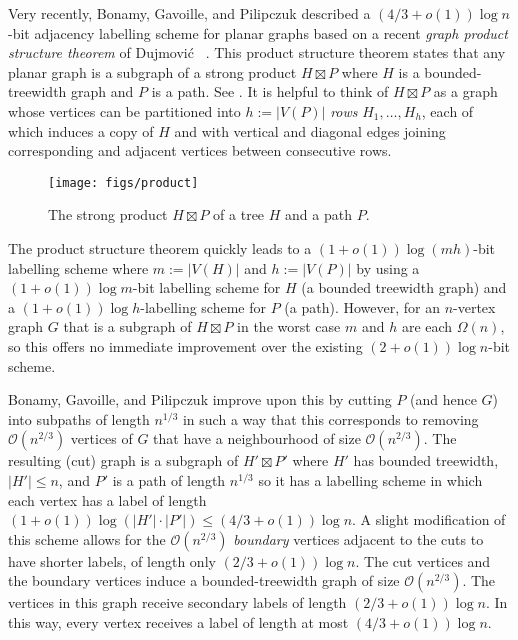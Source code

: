\documentclass[kpfonts]{patmorin}
\newcommand{\Oh}{\mathcal{O}}
\let\le\leqslant
\begin{document}
Very recently, Bonamy, Gavoille, and Pilipczuk \cite{bonamy.gavoille.ea:shorter} described a $(4/3+o(1))\log n$-bit adjacency labelling scheme for planar graphs based on a recent \emph{graph product structure theorem} of Dujmović \etal\ \cite{dujmovic.joret.ea:planar}.  This product structure theorem states that any planar graph is a subgraph of a strong product $H\boxtimes P$ where $H$ is a bounded-treewidth graph and $P$ is a path. See . It is helpful to think of $H\boxtimes P$ as a graph whose vertices can be partitioned into $h:=|V(P)|$ \emph{rows} $H_1,\ldots,H_{h}$, each of which induces a copy of $H$ and with vertical and diagonal edges joining corresponding and adjacent vertices between consecutive rows.

\begin{figure}[htbp]
  \begin{center}
    \texttt{[image: figs/product]}
  \end{center}
  \caption{The strong product $H\boxtimes P$ of a tree $H$ and a path $P$.}
\end{figure}

The product structure theorem quickly leads to a $(1+o(1))\log(mh)$-bit labelling scheme where $m:=|V(H)|$ and $h:=|V(P)|$ by using a $(1+o(1))\log m$-bit labelling scheme for $H$ (a bounded treewidth graph) and a $(1+o(1))\log h$-labelling scheme for $P$ (a path).
However, for an $n$-vertex graph $G$ that is a subgraph of $H\boxtimes P$ in the worst case $m$ and $h$ are each $\Omega(n)$, so this offers no immediate improvement over the existing $(2+o(1))\log n$-bit scheme.

Bonamy, Gavoille, and Pilipczuk improve upon this by cutting $P$ (and hence $G$) into subpaths of length $n^{1/3}$ in such a way that this corresponds to removing $\Oh(n^{2/3})$ vertices of $G$ that have a neighbourhood of size $\Oh(n^{2/3})$. The resulting (cut) graph is a subgraph of $H'\boxtimes P'$ where $H'$ has bounded treewidth, $|H'|\le n$, and $P'$ is a path of length $n^{1/3}$ so it has a labelling scheme in which each vertex has a label of length $(1+o(1))\log (|H'|\cdot|P'|) \le (4/3+o(1))\log n$.  A slight modification of this scheme allows for the $\Oh(n^{2/3})$ \emph{boundary} vertices adjacent to the cuts to have shorter labels, of length only $(2/3+o(1))\log n$.  The cut vertices and the boundary vertices induce a bounded-treewidth graph of size $\Oh(n^{2/3})$.  The vertices in this graph receive secondary labels of length $(2/3+o(1))\log n$.  In this way, every vertex receives a label of length at most $(4/3 + o(1))\log n$.
\end{document}
